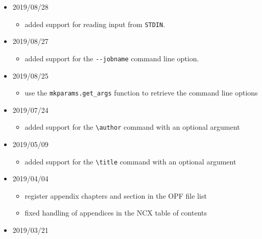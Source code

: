 \begin{itemize}
  \begin{itemize}
  \tightlist
  \item
    make the default build sequence before loading of the extensions.
    Some extensions need to modify the build sequence.
  \end{itemize}
\item
  2019/08/28

  \begin{itemize}
  \tightlist
  \item
    added support for reading input from \texttt{STDIN}.
  \end{itemize}
\item
  2019/08/27

  \begin{itemize}
  \tightlist
  \item
    added support for the \texttt{-\/-jobname} command line option.
  \end{itemize}
\item
  2019/08/25

  \begin{itemize}
  \tightlist
  \item
    use the \texttt{mkparams.get\_args} function to retrieve the command
    line options
  \end{itemize}
\item
  2019/07/24

  \begin{itemize}
  \tightlist
  \item
    added support for the \texttt{\textbackslash{}author} command with
    an optional argument
  \end{itemize}
\item
  2019/05/09

  \begin{itemize}
  \tightlist
  \item
    added support for the \texttt{\textbackslash{}title} command with an
    optional argument
  \end{itemize}
\item
  2019/04/04

  \begin{itemize}
  \tightlist
  \item
    register appendix chapters and section in the OPF file list
  \item
    fixed handling of appendices in the NCX table of contents
  \end{itemize}
\item
  2019/03/21


\end{itemize}
